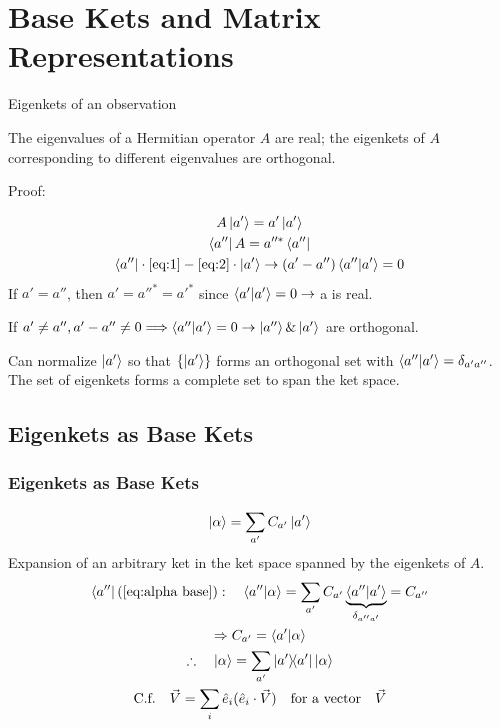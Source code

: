 \section{Base Kets and Matrix Representations}
\begin{frame}{Eigenkets of an observation}
	\begin{theorem}[1]
		The eigenvalues of a Hermitian operator $A$ are real; the eigenkets of $A$ corresponding to different eigenvalues are orthogonal.
	\end{theorem}
	Proof:

	\begin{gather}
		A\ket{a'} = a'\ket{a'} \label{eq:1}\\
		\bra{a'' }A = a''^* \bra{a''} \label{eq:2}\\
		\bra{a''} \cdot \ref{eq:1} - \ref{eq:2}\cdot \ket{a'} \to (a'-a'') \ip{a''}{a'} = 0
	\end{gather}
	If $a'=a''$, then $a'=a''^*=a'^*$ since $\ip{a'}{a'} = 0 \to $ a is real.

	If $a'\ne a'', a'-a'' \ne 0 \Longrightarrow \ip{a''}{a'} = 0 \to \ket{a''} \& \ket{a'}$ are orthogonal.

	\vfill

	Can normalize $\ket{a'}$ so that $\{\ket{a'}\}$ forms an orthogonal set with $\ip{a''}{a'}= \delta_{a' a''}$.
	The set of eigenkets forms a complete set to span the ket space.
\end{frame}

\subsection{Eigenkets as Base Kets}
\begin{frame}
	\frametitle{Eigenkets as Base Kets}

	\begin{equation}\label{eq:alpha base}
		\ket{\alpha} = \sum_{a'} C_{a'} \ket{a'}
	\end{equation}
	Expansion of an arbitrary ket in the ket space spanned by the eigenkets of $A$.
	\begin{gather*}
		\bra{a''} (\ref{eq:alpha base}): \quad \ip{a''}{\alpha} = \sum_{a'} C_{a'} \underbrace{\ip{a''}{a'}}_{\delta_{a'' a'}} = C_{a''}\\
		\Rightarrow C_{a'} = \ip{a'}{\alpha}\\
		\therefore \quad \ket{\alpha} = \sum_{a'} \op{a'}\ket{\alpha}\\
		\text{C.f.} \quad \vec{V} = \sum_i \hat e_i (\hat e_i \cdot \vec V) \qq{for a vector} \vec V
	\end{gather*}
\end{frame}


